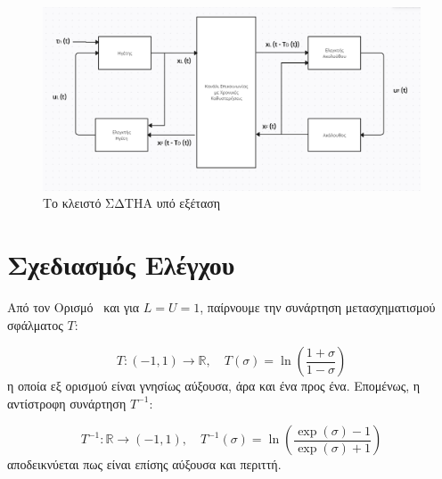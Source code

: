\begin{figure}[!ht]
  \begin{center}
    \includegraphics[width=1\linewidth]{Chapters/Chapter2/Figures/Control_System_Schema.png}
    \caption[Το κλειστό ΣΔΤΗΑ υπό εξέταση]{Το κλειστό ΣΔΤΗΑ υπό εξέταση}
    \label{system}
  \end{center}
\end{figure}

\section{Σχεδιασμός Ελέγχου} \label{Chapter2Section2}

\bigskip
Από τον Ορισμό~ και για $L=U=1$, παίρνουμε την συνάρτηση μετασχηματισμού σφάλματος $T$:

\begin{equation}
  T : (-1, 1) \rightarrow \mathbb{R}, \quad T(\sigma) = \ln\left( \frac{1 + \sigma}{1 - \sigma} \right) \label{T_function_with_values}
\end{equation}
η οποία εξ ορισμού είναι γνησίως αύξουσα, άρα και ένα προς ένα. Επομένως, η αντίστροφη συνάρτηση \( T^{-1} \):

\begin{equation}
  T^{-1} : \mathbb{R} \rightarrow (-1, 1), \quad T^{-1}(\sigma) = \ln\left( \frac{\exp({\sigma}) - 1}{\exp({\sigma}) + 1} \right) \label{T_inv_function}
\end{equation}
αποδεικνύεται πως είναι επίσης αύξουσα και περιττή.

